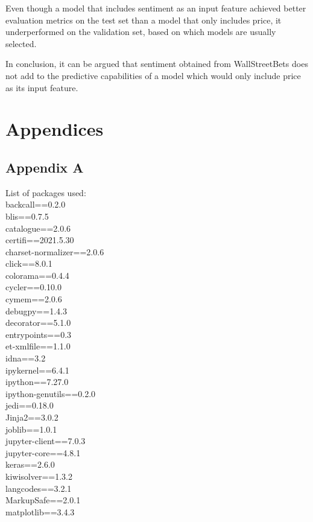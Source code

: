 \documentclass[11pt, a4paper]{article}
\begin{document}
Even though a model that includes sentiment as an input feature achieved better evaluation metrics on the test set than a model that only includes price,
it underperformed on the validation set, based on which models are usually selected.

In conclusion, it can be argued that sentiment obtained from WallStreetBets
does not add to the predictive capabilities of a model which would only include price as its input feature.

\newpage

\pagebreak
\section{Appendices}

\subsection{Appendix A}
\label{appendix:A}
List of packages used:\\
backcall==0.2.0\\
blis==0.7.5\\
catalogue==2.0.6\\
certifi==2021.5.30\\
charset-normalizer==2.0.6\\
click==8.0.1\\
colorama==0.4.4\\
cycler==0.10.0\\
cymem==2.0.6\\
debugpy==1.4.3\\
decorator==5.1.0\\
entrypoints==0.3\\
et-xmlfile==1.1.0\\
idna==3.2\\
ipykernel==6.4.1\\
ipython==7.27.0\\
ipython-genutils==0.2.0\\
jedi==0.18.0\\
Jinja2==3.0.2\\
joblib==1.0.1\\
jupyter-client==7.0.3\\
jupyter-core==4.8.1\\
keras==2.6.0\\
kiwisolver==1.3.2\\
langcodes==3.2.1\\
MarkupSafe==2.0.1\\
matplotlib==3.4.3\\
\end{document}
